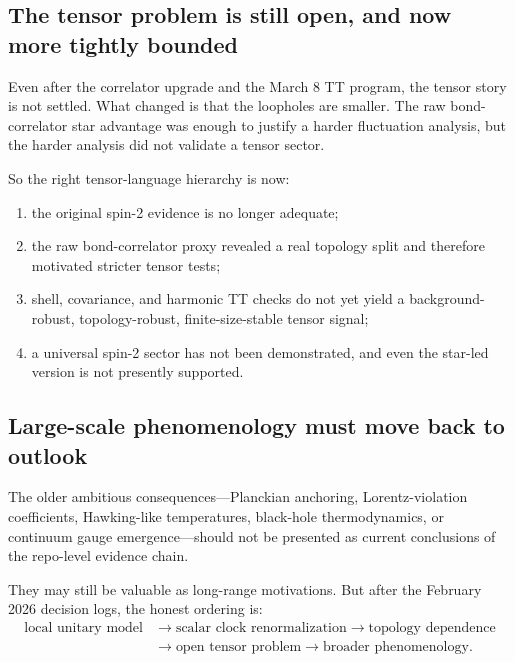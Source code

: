 \documentclass[11pt]{article}
\begin{document}
\subsection{The tensor problem is still open, and now more tightly bounded}

Even after the correlator upgrade and the March 8 TT program, the tensor story is not settled. What changed is that the loopholes are smaller. The raw bond-correlator star advantage was enough to justify a harder fluctuation analysis, but the harder analysis did not validate a tensor sector.

So the right tensor-language hierarchy is now:
\begin{enumerate}
    \item the original spin-2 evidence is no longer adequate;
    \item the raw bond-correlator proxy revealed a real topology split and therefore motivated stricter tensor tests;
    \item shell, covariance, and harmonic TT checks do not yet yield a background-robust, topology-robust, finite-size-stable tensor signal;
    \item a universal spin-2 sector has not been demonstrated, and even the star-led version is not presently supported.
\end{enumerate}

\subsection{Large-scale phenomenology must move back to outlook}

The older ambitious consequences---Planckian anchoring, Lorentz-violation coefficients, Hawking-like temperatures, black-hole thermodynamics, or continuum gauge emergence---should not be presented as current conclusions of the repo-level evidence chain.

They may still be valuable as long-range motivations. But after the February 2026 decision logs, the honest ordering is:
\begin{equation}
\begin{aligned}
\text{local unitary model}
&\rightarrow
\text{scalar clock renormalization}
\rightarrow
\text{topology dependence} \\
&\rightarrow
\text{open tensor problem}
\rightarrow
\text{broader phenomenology}.
\end{aligned}
\end{equation}
\end{document}

